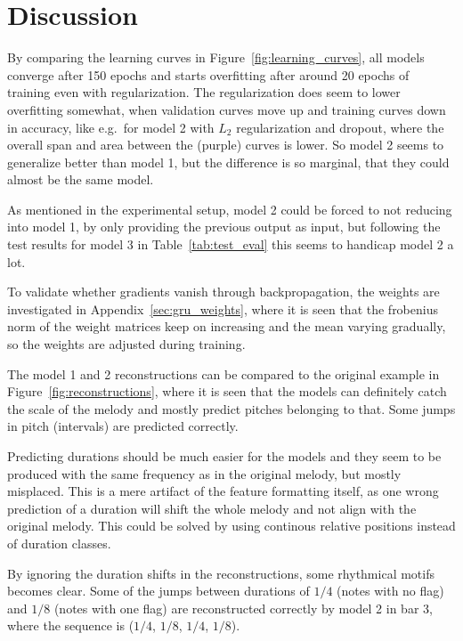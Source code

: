 \section{Discussion}
\label{sec:discussion}
By comparing the learning curves in Figure~\ref{fig:learning_curves}, all models converge after 150 epochs and starts overfitting after around 20 epochs of training even with regularization. The regularization does seem to lower overfitting somewhat, when validation curves move up and training curves down in accuracy, like e.g.\ for model 2 with $L_2$ regularization and dropout, where the overall span and area between the (purple) curves is lower. So model 2 seems to generalize better than model 1, but the difference is so marginal, that they could almost be the same model.

As mentioned in the experimental setup, model 2 could be forced to not reducing into model 1, by only providing the previous output as input, but following the test results for model 3 in Table~\ref{tab:test_eval} this seems to handicap model 2 a lot.  

To validate whether gradients vanish through backpropagation, the weights are investigated in Appendix~\ref{sec:gru_weights}, where it is seen that the frobenius norm of the weight matrices keep on increasing and the mean varying gradually, so the weights are adjusted during training. 

The model 1 and 2 reconstructions can be compared to the original example in Figure~\ref{fig:reconstructions}, where it is seen that the models can definitely catch the scale of the melody and mostly predict pitches belonging to that. Some jumps in pitch (intervals) are predicted correctly.

Predicting durations should be much easier for the models and they seem to be produced with the same frequency as in the original melody, but mostly misplaced. This is a mere artifact of the feature formatting itself, as one wrong prediction of a duration will shift the whole melody and not align with the original melody. This could be solved by using continous relative positions instead of duration classes. 

By ignoring the duration shifts in the reconstructions, some rhythmical motifs becomes clear. Some of the jumps between durations of $1/4$ (notes with no flag) and $1/8$ (notes with one flag) are reconstructed correctly by model 2 in bar 3, where the sequence is ($1/4$, $1/8$, $1/4$, $1/8$). 
